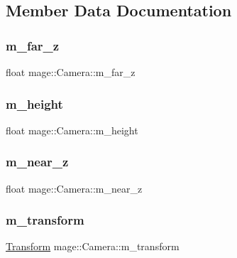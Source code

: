 \subsection{Member Data Documentation}
\hypertarget{classmage_1_1_camera_abe2eeca725ce3da238256007454b241f}{}\label{classmage_1_1_camera_abe2eeca725ce3da238256007454b241f} 
\subsubsection{\texorpdfstring{m\+\_\+far\+\_\+z}{m\_far\_z}}
{\footnotesize\ttfamily float mage\+::\+Camera\+::m\+\_\+far\+\_\+z\hspace{0.3cm}{\ttfamily [protected]}}

\hypertarget{classmage_1_1_camera_a48485eca596702f0e5985ec8b7db35a5}{}\label{classmage_1_1_camera_a48485eca596702f0e5985ec8b7db35a5} 
\subsubsection{\texorpdfstring{m\+\_\+height}{m\_height}}
{\footnotesize\ttfamily float mage\+::\+Camera\+::m\+\_\+height\hspace{0.3cm}{\ttfamily [protected]}}

\hypertarget{classmage_1_1_camera_a685f8700a29d1f1eff2bec353c3ec970}{}\label{classmage_1_1_camera_a685f8700a29d1f1eff2bec353c3ec970} 
\subsubsection{\texorpdfstring{m\+\_\+near\+\_\+z}{m\_near\_z}}
{\footnotesize\ttfamily float mage\+::\+Camera\+::m\+\_\+near\+\_\+z\hspace{0.3cm}{\ttfamily [protected]}}

\hypertarget{classmage_1_1_camera_a5f7bd764e2a4a9221bf1f157fa23b3af}{}\label{classmage_1_1_camera_a5f7bd764e2a4a9221bf1f157fa23b3af} 
\subsubsection{\texorpdfstring{m\+\_\+transform}{m\_transform}}
{\footnotesize\ttfamily \hyperlink{structmage_1_1_transform}{Transform} mage\+::\+Camera\+::m\+\_\+transform\hspace{0.3cm}{\ttfamily [protected]}}

